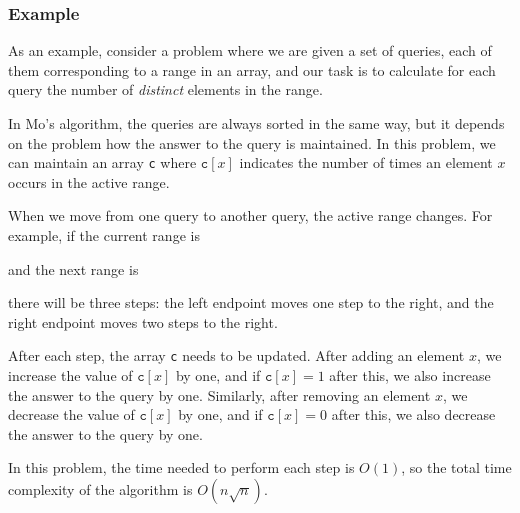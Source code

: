 \subsubsection*{Example}

As an example, consider a problem
where we are given a set of queries,
each of them corresponding to a range in an array,
and our task is to calculate for each query
the number of \emph{distinct} elements in the range.

In Mo's algorithm, the queries are always sorted
in the same way, but it depends on the problem
how the answer to the query is maintained.
In this problem, we can maintain an array 
\texttt{c} where $\texttt{c}[x]$
indicates the number of times an element $x$
occurs in the active range.

When we move from one query to another query,
the active range changes.
For example, if the current range is
\begin{center}
\end{center}
and the next range is
\begin{center}
\end{center}
there will be three steps:
the left endpoint moves one step to the right,
and the right endpoint moves two steps to the right.

After each step, the array \texttt{c}
needs to be updated.
After adding an element $x$,
we increase the value of 
$\texttt{c}[x]$ by one,
and if $\texttt{c}[x]=1$ after this,
we also increase the answer to the query by one.
Similarly, after removing an element $x$,
we decrease the value of 
$\texttt{c}[x]$ by one,
and if $\texttt{c}[x]=0$ after this,
we also decrease the answer to the query by one.

In this problem, the time needed to perform
each step is $O(1)$, so the total time complexity
of the algorithm is $O(n \sqrt n)$.